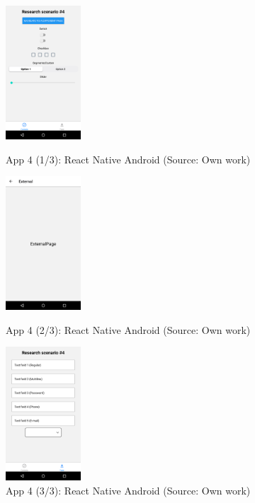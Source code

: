 \begin{figure}[H]
  \begin{minipage}{.31\textwidth}
    \centering
    \includegraphics[height=50mm]{img/app4_1_rn_android}
    \caption{App 4 (1/3): React Native Android (Source: Own work)}
    \label{fig:app4_1_rn_android}
  \end{minipage}
  \hfill
  \begin{minipage}{.31\textwidth}
    \centering
    \includegraphics[height=50mm]{img/app4_2_rn_android}
    \caption{App 4 (2/3): React Native Android (Source: Own work)}
    \label{fig:app4_2_rn_android}
  \end{minipage}
  \hfill
  \begin{minipage}{.31\textwidth}
    \centering
    \includegraphics[height=50mm]{img/app4_3_rn_android}
    \caption{App 4 (3/3): React Native Android (Source: Own work)}
    \label{fig:app4_3_rn_android}
  \end{minipage}
\end{figure}

